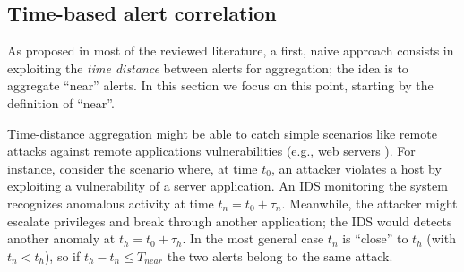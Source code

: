 \subsection{Time-based alert correlation}
\label{correlation:fusion:time-based-alert}
As proposed in most of the reviewed literature, a first, naive
approach consists in exploiting the \emph{time distance} between
alerts for aggregation; the idea is to aggregate ``near'' alerts. In
this section we focus on this point, starting by the definition of
``near''.

Time-distance aggregation might be able to catch simple scenarios like
remote attacks against remote applications vulnerabilities (e.g., web
servers ). For instance, consider the scenario where, at time $t_{0}$,
an attacker violates a host by exploiting a vulnerability of a server
application. An \ac{IDS} monitoring the system recognizes
anomalous activity at time $t_{n} = t_{0} + \tau_{n}$. Meanwhile, the
attacker might escalate privileges and break through another
application; the \ac{IDS} would detects another anomaly at
$t_{h} = t_{0} + \tau_{h}$. In the most general case $t_{n}$ is
``close'' to $t_{h}$ (with $t_{n} < t_{h}$), so if $t_{h} - t_{n} \leq
T_{near}$ the two alerts belong to the same attack.

